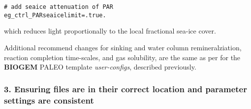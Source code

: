 \documentclass[11pt,fleqn]{book} %
\begin{document}
\begin{itemize}[noitemsep]
\begin{enumerate}[noitemsep]
\small\vspace{-1mm}\begin{verbatim}
# add seaice attenuation of PAR
eg_ctrl_PARseaicelimit=.true.
\end{verbatim}\vspace{-1mm}\normalsize
which reduces light proportionally to the local fractional sea-ice cover.
\end{enumerate}
Additional recommend changes for sinking and water column remineralziation, reaction completion time-scales, and gas solubility, are the same as per for the \textbf{BIOGEM} PALEO template \textit{user-configs}, described previously.

\end{itemize}

%
\subsubsection{3. Ensuring files are in their correct location and parameter settings are consistent}
\end{document}
